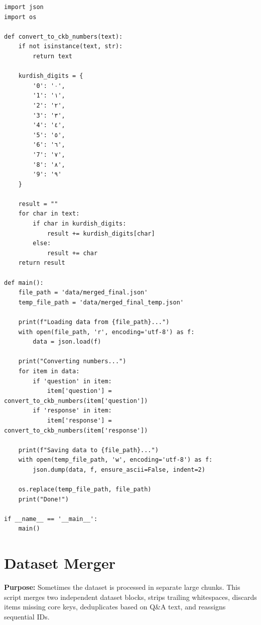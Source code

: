 \documentclass[11pt]{article}
\begin{document}
\begin{lstlisting}[style=pythoncode, caption={number\_converter.py}]
import json
import os

def convert_to_ckb_numbers(text):
    if not isinstance(text, str):
        return text
        
    kurdish_digits = {
        '0': '٠',
        '1': '١',
        '2': '٢',
        '3': '٣',
        '4': '٤',
        '5': '٥',
        '6': '٦',
        '7': '٧',
        '8': '٨',
        '9': '٩'
    }
    
    result = ""
    for char in text:
        if char in kurdish_digits:
            result += kurdish_digits[char]
        else:
            result += char
    return result

def main():
    file_path = 'data/merged_final.json'
    temp_file_path = 'data/merged_final_temp.json'
    
    print(f"Loading data from {file_path}...")
    with open(file_path, 'r', encoding='utf-8') as f:
        data = json.load(f)
        
    print("Converting numbers...")
    for item in data:
        if 'question' in item:
            item['question'] = convert_to_ckb_numbers(item['question'])
        if 'response' in item:
            item['response'] = convert_to_ckb_numbers(item['response'])
            
    print(f"Saving data to {file_path}...")
    with open(temp_file_path, 'w', encoding='utf-8') as f:
        json.dump(data, f, ensure_ascii=False, indent=2)
        
    os.replace(temp_file_path, file_path)
    print("Done!")

if __name__ == '__main__':
    main()
\end{lstlisting}


\section{Dataset Merger} \label{sec:merger}
\textbf{Purpose:} Sometimes the dataset is processed in separate large chunks. This script merges two independent dataset blocks, strips trailing whitespaces, discards items missing core keys, deduplicates based on Q\&A text, and reassigns sequential IDs.
\end{document}

